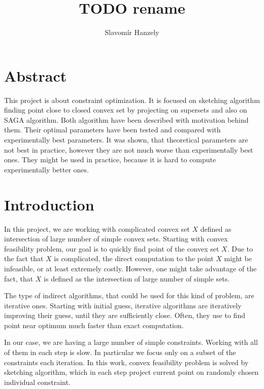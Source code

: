 \documentclass[11pt]{book}
\begin{document}
\title{\textbf{TODO rename}}
\author{Slavomír Hanzely}
\maketitle

\chapter*{\centering Abstract}

This project is about constraint optimization. It is focused on sketching algorithm finding point close to closed convex set by projecting on supersets and also on SAGA algorithm. Both algorithm have been described with motivation behind them. Their optimal parameters have been tested and compared with experimentally best parameters. It was shown, that theoretical parameters are not best in practice, however they are not much worse than experimentally best ones. They might be used in practice, because it is hard to compute experimentally better ones.

\tableofcontents

\chapter{Introduction}

In this project, we are working with complicated convex set $X$ defined as intersection of large number of simple convex sets. Starting with convex feasibility problem, our goal is to quickly find point of the convex set $X$. Due to the fact that $X$ is complicated, the direct computation to the point $X$ might be infeasible, or at least extremely costly. However, one might take advantage of the fact, that $X$ is defined as the intersection of large number of simple sets.

The type of indirect algorithms, that could be used for this kind of problem, are iterative ones. Starting with initial guess, iterative algorithms are iteratively improving their guess, until they are sufficiently close. Often, they use to find point near optimum much faster than exact computation.

In our case, we are having a large number of simple constraints. Working with all of them in each step is slow. In particular we focus only on a subset of the constraints each iteration. In this work, convex feasibility problem is solved by sketching algorithm, which in each step project current point on randomly chosen individual constraint.\\
\end{document}
